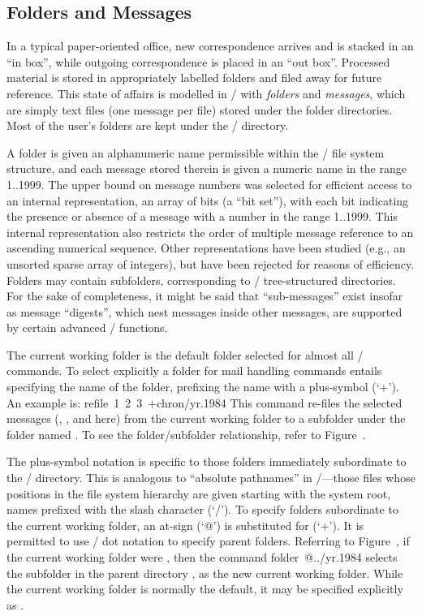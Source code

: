 \subsection{Folders and Messages}
In a typical paper-oriented office,
new correspondence arrives and is stacked in an ``in box'',
while outgoing correspondence is placed in an ``out box''.
Processed material is stored in
appropriately labelled folders and filed away for future reference.
This state of affairs is modelled in \MH/ with {\it folders}
and {\it messages},
which are simply text files (one message per file) stored
under the folder directories.
Most of the user's folders are kept under the \Mail/ directory.

A folder is given an alphanumeric name permissible within the \unix/ file
system structure,
and each message stored therein is given a numeric name in the range 1..1999.
The upper bound on message numbers was
selected for efficient access to an internal representation,
an array of bits (a ``bit set''),
with each bit indicating the presence or
absence of a message with a number in the range 1..1999.
This internal representation also restricts the order of multiple
message reference to an ascending numerical sequence.
Other representations have been studied
(e.g., an unsorted sparse array of integers),
but have been rejected for reasons of efficiency.
Folders may contain subfolders,
corresponding to \unix/ tree-structured directories.
For the sake of completeness,
it might be said that ``sub-messages'' exist insofar as message ``digests'',
which nest messages inside other messages,
are supported by certain advanced \MH/ functions.

The current working folder is the default folder selected for almost
all \MH/ commands.
To select explicitly a folder for mail handling
commands entails specifying the name of the folder, prefixing the name
with a plus-symbol (`+').
An example is: \example refile\ 1\ 2\ 3\ +chron/yr.1984\endexample
This command re-files the selected messages
(, , and  here)
from the current working folder to a subfolder under the
folder  named .
To see the folder/subfolder relationship, refer to Figure~\MHfiles.

The plus-symbol notation is specific to those folders immediately
subordinate to the \Mail/ directory.
This is analogous to ``absolute pathnames'' in \unix/---those
files whose positions in the file system
hierarchy are given starting with the system root,
names prefixed with the slash character (`/').
To specify folders subordinate to the current working folder,
an at-sign (`@') is substituted for (`+').
It is permitted to use \unix/ dot notation to specify parent folders.
Referring to Figure~\MHfiles,
if the current working folder were ,
then the command \example folder\ @../yr.1984\endexample
\noindent
selects the subfolder  in the parent directory
, as the new current working folder.
While the current working folder is normally the default, it may be
specified explicitly as .

